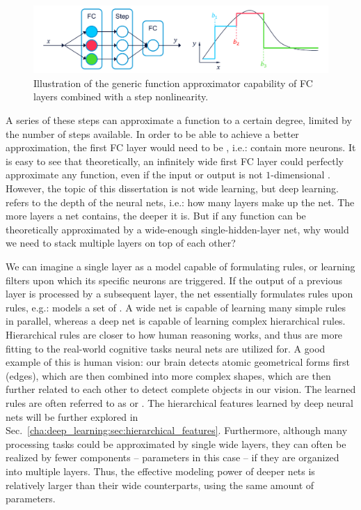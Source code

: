 			\begin{figure}[ht]
				\centering
				\includegraphics[width=\linewidth]{figures/02_deep_learning/generic_approximator/generic_approximator.pdf}
				\caption[Generic function approximation with MLPs]{Illustration of the generic function approximator capability of FC layers combined with a step nonlinearity.}
				\label{fig:generic_approximator}
			\end{figure}
			
			A series of these steps can approximate a function to a certain degree, limited by the number of steps available.
			In order to be able to achieve a better approximation, the first \ac{FC} layer would need to be , i.e.: contain more neurons.
			It is easy to see that theoretically, an infinitely wide first \ac{FC} layer could perfectly approximate any function, even if the input or output is not $1$-dimensional \cite{neuralnetsanddeeplearning}.
			However, the topic of this dissertation is not wide learning, but deep learning.
			 refers to the depth of the neural nets, i.e.: how many layers make up the net.
			The more layers a net contains, the deeper it is.
			But if any function can be theoretically approximated by a wide-enough single-hidden-layer net, why would we need to stack multiple layers on top of each other?
			
			We can imagine a single layer as a model capable of formulating rules, or learning filters upon which its specific neurons are triggered.
			If the output of a previous layer is processed by a subsequent layer, the net essentially formulates rules upon rules, e.g.: models a set of  \cite{neuralnetsanddeeplearning}.
			A wide net is capable of learning many simple rules in parallel, whereas a deep net is capable of learning complex hierarchical rules.
			Hierarchical rules are closer to how human reasoning works, and thus are more fitting to the real-world cognitive tasks neural nets are utilized for.
			A good example of this is human vision: our brain detects atomic geometrical forms first (edges), which are then combined into more complex shapes, which are then further related to each other to detect complete objects in our vision.
			The learned rules are often referred to as  or .
			The hierarchical features learned by deep neural nets will be further explored in Sec.~\ref{cha:deep_learning:sec:hierarchical_features}.
			Furthermore, although many processing tasks could be approximated by single wide layers, they can often be realized by fewer components -- parameters in this case -- if they are organized into multiple layers.
			Thus, the effective modeling power of deeper nets is relatively larger than their wide counterparts, using the same amount of parameters. 
	
